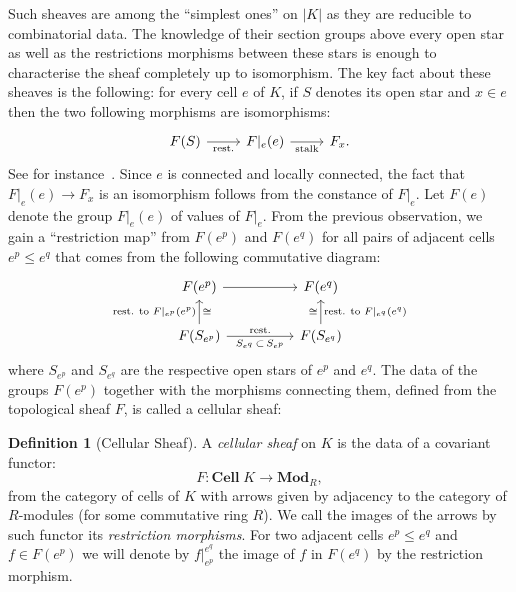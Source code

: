 \documentclass[10pt]{amsart}
\theoremstyle{definition}
\newtheorem{defi}[theo]{Definition}
\numberwithin{equation}{section}
\numberwithin{figure}{section}
\newcommand{\Cell}{\mathbf{Cell}}
\newcommand{\Mod}{\mathbf{Mod}}
\begin{document}
Such sheaves are among the ``simplest ones'' on $|K|$ as they are reducible to combinatorial data. The knowledge of their section groups above every open star as well as the restrictions morphisms between these stars is enough to characterise the sheaf completely up to isomorphism. The key fact about these sheaves is the following: for every cell $e$ of $K$, if $S$ denotes its open star and $x\in e$ then the two following morphisms are isomorphisms:
\begin{equation*}
\begin{tikzcd}
F(S)\arrow[r,"\text{rest.}" below] & F|_e(e) \ar[r, "\text{stalk}" below] & F_x.
\end{tikzcd}
\end{equation*}
See for instance~\cite[Proposition~1.3 p.~323]{Kas_rie_hil}. Since $e$ is connected and locally connected, the fact that $F|_e(e) \rightarrow F_x$ is an isomorphism follows from the constance of $F|_e$. Let $F(e)$ denote the group $F|_e(e)$ of values of $F|_e$. From the previous observation, we gain a ``restriction map'' from $F(e^p)$ and $F(e^q)$ for all pairs of adjacent cells $e^p\leq e^q$ that comes from the following commutative diagram:
\begin{equation*}
\begin{tikzcd}
F(e^p) \arrow[rr] & & F(e^q) \\
F(S_{e^p}) \arrow[u,"\text{rest. to }F|_{e^p}(e^p)" left, "\cong " right] \arrow[rr, "S_{e^q}\,\subset\,S_{e^p}" below, "\text{rest.}" above] & & F(S_{e^q}) \ar[u, "\text{rest. to }F|_{e^q}(e^q)" right, "\cong" left]
\end{tikzcd}
\end{equation*}
where $S_{e^p}$ and $S_{e^q}$ are the respective open stars of $e^p$ and $e^q$. The data of the groups $F(e^p)$ together with the morphisms connecting them, defined from the topological sheaf $F$, is called a cellular sheaf:

\begin{defi}[Cellular Sheaf]
A \emph{cellular sheaf} on $K$ is the data of a covariant functor:
\begin{equation*}
F:\Cell\;K\rightarrow \Mod_R,
\end{equation*}
from the category of cells of $K$ with arrows given by adjacency to the category of $R$-modules (for some commutative ring $R$). We call the images of the arrows by such functor its \emph{restriction morphisms}. For two adjacent cells $e^p\leq e^q$ and $f\in F(e^p)$ we will denote by $f|^{e^q}_{e^p}$ the image of $f$ in $F(e^q)$ by the restriction morphism.
\end{defi}
\end{document}
